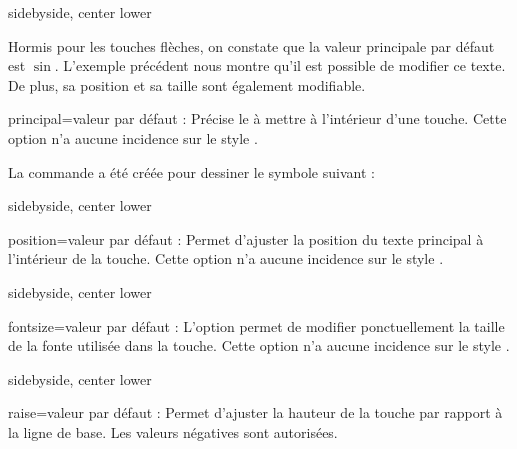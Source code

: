 \documentclass[10pt,french,a4paper]{article}
\newcommand*\Speciale{Cette option n'a aucune incidence sur le style \docValue{arrows}.\xspace}
\begin{document}
\begin{dispExample*}{sidebyside, center lower}
\TiC[style=number, rounded=left, principal=1]
\TiC[style=number, rounded=none, principal=2]
\TiC[style=number, rounded=right, principal=3]
\end{dispExample*}
\medbreak

Hormis pour les touches flèches, on constate que la valeur principale par défaut est $\sin$. L'exemple précédent nous montre qu'il est possible de modifier ce texte. De plus, sa position et sa taille sont également modifiable.\medbreak

\begin{docKey}{principal}{=}{valeur par défaut : }
Précise le  à mettre à l'intérieur d'une touche. \Speciale
\end{docKey}

La commande  a été créée pour dessiner le symbole suivant : \raisebox{-0.5em}{\Aff}

\begin{dispExample*}{sidebyside, center lower}
\TiC[principal=stats]
\TiC[style=number, principal=2]
\TiC[principal=\Aff]
\end{dispExample*}
\medbreak

\begin{docKey}{position}{=}{valeur par défaut : }
Permet d'ajuster la position du texte principal à l'intérieur de la touche. \Speciale
\end{docKey}

\begin{dispExample*}{sidebyside, center lower}
\TiC[principal=op]
\TiC[principal=op, position = 0.5]
\TiC[principal=op, position = 1.1]
\end{dispExample*}
\medbreak

\begin{docKey}{fontsize}{=}{valeur par défaut : \docValue{6pt}}
    L'option  permet de modifier ponctuellement la taille de la fonte utilisée dans la touche. \Speciale
\end{docKey}
\begin{dispExample*}{sidebyside, center lower}
\TiC[principal={$\triangleright$ simp}]
\TiC[principal={$\triangleright$ simp}, fontsize=5pt, position=1]
\qquad
\TiC[style=number, principal=2]
\TiC[style=number, principal=2,fontsize=9pt]
\end{dispExample*}
\medbreak

\begin{docKey}{raise}{=}{valeur par défaut : \docValue{0ex}}
Permet d'ajuster la hauteur de la touche par rapport à la ligne de base. Les valeurs négatives sont autorisées.
\end{docKey}
\end{document}
